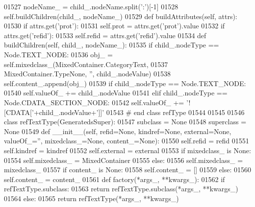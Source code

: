 \begin{DoxyCode}
{{{{{{{{{{{{{{{{{{{{{{{{{{{{{{{{{{{{{{{{{{{{{{{{{{{{{{{{{{{{{{{{{{{{{{{{{{{{{{{{{{{{{{{{{{{{{{{{{01527             nodeName\_ = child\_.nodeName.split(\textcolor{stringliteral}{':'})[-1]
01528             self.buildChildren(child\_, nodeName\_)
01529     \textcolor{keyword}{def }buildAttributes(self, attrs):
01530         \textcolor{keywordflow}{if} attrs.get(\textcolor{stringliteral}{'prot'}):
01531             self.prot = attrs.get(\textcolor{stringliteral}{'prot'}).value
01532         \textcolor{keywordflow}{if} attrs.get(\textcolor{stringliteral}{'refid'}):
01533             self.refid = attrs.get(\textcolor{stringliteral}{'refid'}).value
01534     \textcolor{keyword}{def }buildChildren(self, child\_, nodeName\_):
01535         \textcolor{keywordflow}{if} child\_.nodeType == Node.TEXT\_NODE:
01536             obj\_ = self.mixedclass_(MixedContainer.CategoryText,
01537                 MixedContainer.TypeNone, \textcolor{stringliteral}{''}, child\_.nodeValue)
01538             self.content\_.append(obj\_)
01539         \textcolor{keywordflow}{if} child\_.nodeType == Node.TEXT\_NODE:
01540             self.valueOf_ += child\_.nodeValue
01541         \textcolor{keywordflow}{elif} child\_.nodeType == Node.CDATA\_SECTION\_NODE:
01542             self.valueOf_ += \textcolor{stringliteral}{'![CDATA['}+child\_.nodeValue+\textcolor{stringliteral}{']]'}
01543 \textcolor{comment}{# end class refType}
01544 
01545 
01546 \textcolor{keyword}{class }refTextType(GeneratedsSuper):
01547     subclass = \textcolor{keywordtype}{None}
01548     superclass = \textcolor{keywordtype}{None}
01549     \textcolor{keyword}{def }__init__(self, refid=None, kindref=None, external=None, valueOf\_='', mixedclass\_=None, 
      content\_=None):
01550         self.refid = refid
01551         self.kindref = kindref
01552         self.external = external
01553         \textcolor{keywordflow}{if} mixedclass\_ \textcolor{keywordflow}{is} \textcolor{keywordtype}{None}:
01554             self.mixedclass_ = MixedContainer
01555         \textcolor{keywordflow}{else}:
01556             self.mixedclass_ = mixedclass\_
01557         \textcolor{keywordflow}{if} content\_ \textcolor{keywordflow}{is} \textcolor{keywordtype}{None}:
01558             self.content_ = []
01559         \textcolor{keywordflow}{else}:
01560             self.content_ = content\_
01561     \textcolor{keyword}{def }factory(*args\_, **kwargs\_):
01562         \textcolor{keywordflow}{if} refTextType.subclass:
01563             \textcolor{keywordflow}{return} refTextType.subclass(*args\_, **kwargs\_)
01564         \textcolor{keywordflow}{else}:
01565             \textcolor{keywordflow}{return} refTextType(*args\_, **kwargs\_)
}}}}}}}}}}}}}}}}}}}}}}}}}}}}}}}}}}}}}}}}}}}}}}}}}}}}}}}}}}}}}}}}}}}}}}}}}}}}}}}}}}}}}}}}}}}}}}}}}
\end{DoxyCode}
